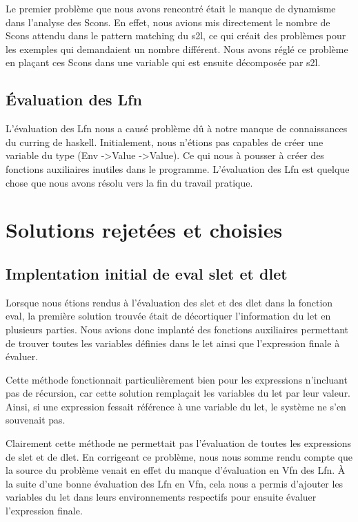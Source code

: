 \documentclass[12pt, letterpaper]{article}
\begin{document}
Le premier problème que nous avons rencontré était le manque de dynamisme
dans l'analyse des Scons. En effet, nous avions mis directement le nombre 
de Scons attendu dans le pattern matching du s2l, ce qui créait des 
problèmes pour les exemples qui demandaient un nombre différent. Nous 
avons réglé ce problème en plaçant ces Scons dans une variable qui est
ensuite décomposée par s2l. 

\subsection*{Évaluation des Lfn}

L'évaluation des Lfn nous a causé problème dû à notre manque de connaissances 
du curring de haskell. Initialement, nous n'étions pas capables de créer une 
variable du type (Env -\textgreater Value -\textgreater Value). Ce qui nous à 
pousser à créer des fonctions auxiliaires inutiles dans le programme. 
L'évaluation des Lfn est quelque chose que nous avons résolu vers la fin du
travail pratique.

\section*{Solutions rejetées et choisies}

\subsection*{Implentation initial de eval slet et dlet}

Lorsque nous étions rendus à l'évaluation des slet et des dlet dans la fonction
eval, la première solution trouvée était de décortiquer l'information du let
en plusieurs parties. Nous avions donc implanté des fonctions auxiliaires
permettant de trouver toutes les variables définies dans le let ainsi que
l'expression finale à évaluer.

Cette méthode fonctionnait particulièrement bien pour les expressions n'incluant
pas de récursion, car cette solution remplaçait les variables du let par leur
valeur. Ainsi, si une expression fessait référence à une variable du let, le
système ne s'en souvenait pas.

Clairement cette méthode ne permettait pas l'évaluation de toutes les
expressions de slet et de dlet. En corrigeant ce problème, nous nous somme
rendu compte que la source du problème venait en effet du manque d'évaluation
en Vfn des Lfn. À la suite d’une bonne évaluation des Lfn en Vfn, cela nous a 
permis d'ajouter les variables du let dans leurs environnements respectifs pour 
ensuite évaluer l'expression finale.
\end{document}
